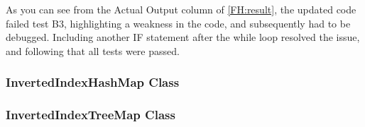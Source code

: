 As you can see from the Actual Output column of \ref{FH:result}, the updated code failed test B3, highlighting a weakness in the code, and subsequently had to be debugged. Including another IF statement after the while loop resolved the issue, and following that all tests were passed.

\subsubsection{InvertedIndexHashMap Class}

\subsubsection{InvertedIndexTreeMap Class}





